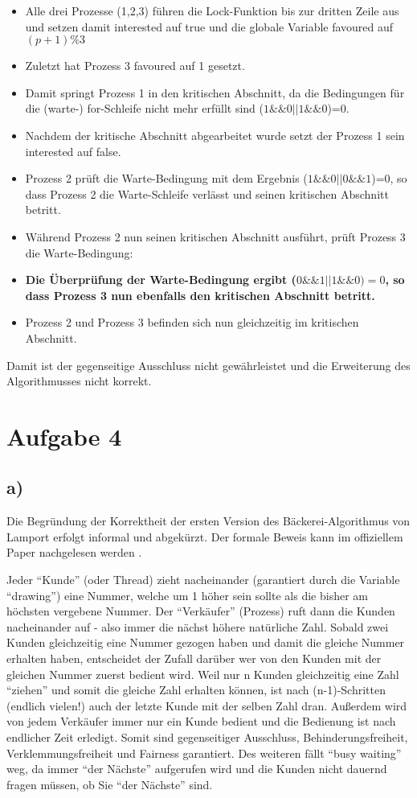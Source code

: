 \documentclass[11pt,a4paper,DIV=10,]{scrartcl}
\begin{document}
\begin{itemize}
 \item Alle drei Prozesse (1,2,3) führen die Lock-Funktion bis zur dritten Zeile aus und setzen damit interested auf true und die globale Variable favoured auf $(p+1)\%3$ 
 \item Zuletzt hat Prozess 3 favoured auf 1 gesetzt. 
 \item Damit springt Prozess 1 in den kritischen Abschnitt, da die Bedingungen für die (warte-) for-Schleife nicht mehr erfüllt sind ($1 \&\& 0 || 1  \&\& 0$)=0.
 \item Nachdem der kritische Abschnitt abgearbeitet wurde setzt der Prozess 1 sein interested auf false. 
 \item Prozess 2 prüft die Warte-Bedingung mit dem Ergebnis ($1 \&\& 0 || 0 \&\& 1$)=0, so dass Prozess 2 die Warte-Schleife verlässt und seinen kritischen Abschnitt betritt. 
 \item Während Prozess 2 nun seinen kritischen Abschnitt ausführt, prüft Prozess 3 die Warte-Bedingung:
 \item \textbf{Die Überprüfung der Warte-Bedingung ergibt ($0 \&\& 1 || 1 \&\& 0)=0$, so dass Prozess 3 nun ebenfalls den kritischen Abschnitt betritt.}
 \item Prozess 2 und Prozess 3 befinden sich nun gleichzeitig im kritischen Abschnitt. 
 \end{itemize}

Damit ist der gegenseitige Ausschluss nicht gewährleistet und die Erweiterung des Algorithmusses nicht korrekt. 

\section*{Aufgabe 4}
\subsection*{a)}
Die Begründung der Korrektheit der ersten Version des Bäckerei-Algorithmus von Lamport erfolgt informal und abgekürzt. Der formale Beweis kann im offiziellem Paper nachgelesen werden \cite[vgl.][]{Lamport.1974}.

Jeder ``Kunde'' (oder Thread) zieht nacheinander (garantiert durch die Variable ``drawing'') eine Nummer, welche um 1 höher sein sollte als die bisher am höchsten vergebene Nummer. Der ``Verkäufer'' (Prozess) ruft dann die Kunden nacheinander auf - also immer die nächst höhere natürliche Zahl. Sobald zwei Kunden gleichzeitig eine Nummer gezogen haben und damit die gleiche Nummer erhalten haben, entscheidet der Zufall darüber wer von den Kunden mit der gleichen Nummer zuerst bedient wird. 
Weil nur n Kunden gleichzeitig eine Zahl ``ziehen'' und somit die gleiche Zahl erhalten können, ist nach (n-1)-Schritten (endlich vielen!) auch der letzte Kunde mit der selben Zahl dran. Außerdem wird von jedem Verkäufer immer nur ein Kunde bedient und die Bedienung ist nach endlicher Zeit erledigt. Somit sind gegenseitiger Ausschluss, Behinderungsfreiheit, Verklemmungsfreiheit und Fairness garantiert. Des weiteren fällt ``busy waiting'' weg, da immer ``der Nächste'' aufgerufen wird und die Kunden nicht dauernd fragen müssen, ob Sie ``der Nächste'' sind. 
\end{document}
